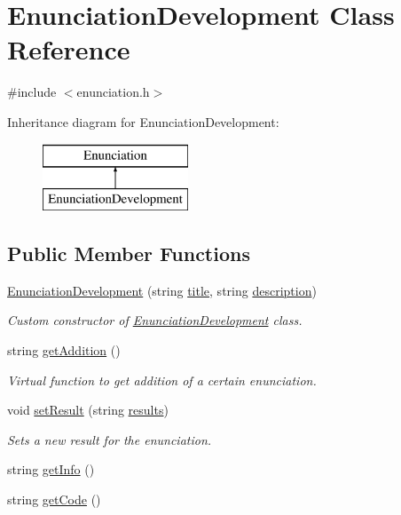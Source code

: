 \hypertarget{class_enunciation_development}{}\section{Enunciation\+Development Class Reference}
\label{class_enunciation_development}


{\ttfamily \#include $<$enunciation.\+h$>$}

Inheritance diagram for Enunciation\+Development\+:\begin{figure}[H]
\begin{center}
\leavevmode
\includegraphics[height=2.000000cm]{class_enunciation_development}
\end{center}
\end{figure}
\subsection*{Public Member Functions}
\begin{DoxyCompactItemize}
\item 
\hyperlink{class_enunciation_development_a8846729f4e511003b416a58cf580c9ff}{Enunciation\+Development} (string \hyperlink{class_enunciation_a5e2accd01df4c81578dc8f7b83507167}{title}, string \hyperlink{class_enunciation_a0b30051b66bd07b227f6a227befb6c0c}{description})
\begin{DoxyCompactList}\small\item\em Custom constructor of \hyperlink{class_enunciation_development}{Enunciation\+Development} class. \end{DoxyCompactList}\item 
string \hyperlink{class_enunciation_development_a5480d39ba25c6fac36d07d3aad6b6de9}{get\+Addition} ()
\begin{DoxyCompactList}\small\item\em Virtual function to get addition of a certain enunciation. \end{DoxyCompactList}\item 
void \hyperlink{class_enunciation_development_afeefc36344ab2cf3949e9bcc9e9f839b}{set\+Result} (string \hyperlink{class_enunciation_development_abc152492be3a1049b84b581022f0bf6f}{results})
\begin{DoxyCompactList}\small\item\em Sets a new result for the enunciation. \end{DoxyCompactList}\item 
string \hyperlink{class_enunciation_development_a06289f811338e030977e59f083c618b6}{get\+Info} ()
\item 
string \hyperlink{class_enunciation_development_aa0e2d2c396cc3ec68df31334ae475850}{get\+Code} ()
\end{DoxyCompactItemize}
